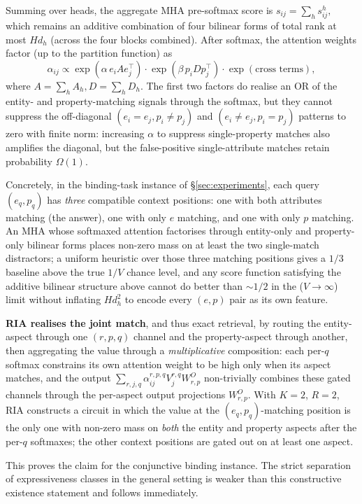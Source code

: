 \documentclass{article}
\begin{document}
Summing over heads, the aggregate MHA pre-softmax score is
\(
  s_{ij} = \sum_h s^h_{ij},
\)
which remains an additive combination of four bilinear forms of
total rank at most $H d_h$ (across the four blocks combined). After
softmax, the attention weights factor (up to the partition function)
as
\[
  \alpha_{ij} \propto \exp(\alpha\, e_i A e_j^\top)
                 \cdot \exp(\beta\, p_i D p_j^\top)
                 \cdot \exp(\text{cross terms}),
\]
where $A = \sum_h A_h, D = \sum_h D_h$. The first two factors do
realise an OR of the entity- and property-matching signals through
the softmax, but they cannot suppress the off-diagonal $(e_i = e_j,
p_i \ne p_j)$ and $(e_i \ne e_j, p_i = p_j)$ patterns to zero with
finite norm: increasing $\alpha$ to suppress single-property matches
also amplifies the diagonal, but the false-positive single-attribute
matches retain probability $\Omega(1)$.

Concretely, in the binding-task instance of \S\ref{sec:experiments},
each query $(e_q, p_q)$ has \emph{three} compatible context
positions: one with both attributes matching (the answer), one with
only $e$ matching, and one with only $p$ matching. An MHA whose
softmaxed attention factorises through entity-only and property-only
bilinear forms places non-zero mass on at least the two single-match
distractors; a uniform heuristic over those three matching positions
gives a $1/3$ baseline above the true $1/V$ chance level, and any
score function satisfying the additive bilinear structure above
cannot do better than $\sim 1/2$ in the ($V \to \infty$) limit
without inflating $H d_h^2$ to encode every $(e, p)$ pair as its
own feature.

\textbf{RIA realises the joint match}, and thus exact retrieval, by
routing the entity-aspect through one $(r, p, q)$ channel and the
property-aspect through another, then aggregating the value through a
\emph{multiplicative} composition: each per-$q$ softmax constrains its
own attention weight to be high only when its aspect matches, and the
output $\sum_{r, j, q} \alpha^{r,p,q}_{ij} V^{r,q}_j W^O_{r,p}$
non-trivially combines these gated channels through the per-aspect
output projections $W^O_{r, p}$. With $K{=}2$, $R{=}2$, RIA
constructs a circuit in which the value at the $(e_q, p_q)$-matching
position is the only one with non-zero mass on \emph{both} the
entity and property aspects after the per-$q$ softmaxes; the other
context positions are gated out on at least one aspect.

This proves the claim for the conjunctive binding instance. The
strict separation of expressiveness classes in the general setting is
weaker than this constructive existence statement and follows
immediately.
\end{document}
